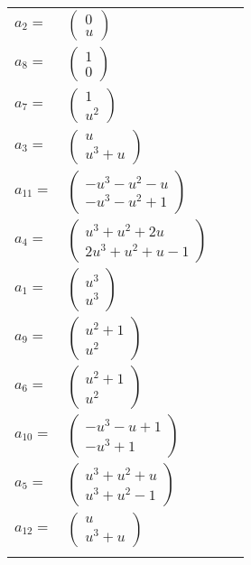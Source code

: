 \documentclass[1p]{elsarticle_modified}
\theoremstyle{definition}
\begin{document}
\begin{tabular}{m{7pt} m{180pt} m{7pt} m{180pt} }
\flushright $a_{2}=$&$\begin{pmatrix}0\\u\end{pmatrix}$ \\
\flushright $a_{8}=$&$\begin{pmatrix}1\\0\end{pmatrix}$ \\
\flushright $a_{7}=$&$\begin{pmatrix}1\\u^2\end{pmatrix}$ \\
\flushright $a_{3}=$&$\begin{pmatrix}u\\u^3+u\end{pmatrix}$ \\
\flushright $a_{11}=$&$\begin{pmatrix}- u^3- u^2- u\\- u^3- u^2+1\end{pmatrix}$ \\
\flushright $a_{4}=$&$\begin{pmatrix}u^3+u^2+2 u\\2 u^3+u^2+u-1\end{pmatrix}$ \\
\flushright $a_{1}=$&$\begin{pmatrix}u^3\\u^3\end{pmatrix}$ \\
\flushright $a_{9}=$&$\begin{pmatrix}u^2+1\\u^2\end{pmatrix}$ \\
\flushright $a_{6}=$&$\begin{pmatrix}u^2+1\\u^2\end{pmatrix}$ \\
\flushright $a_{10}=$&$\begin{pmatrix}- u^3- u+1\\- u^3+1\end{pmatrix}$ \\
\flushright $a_{5}=$&$\begin{pmatrix}u^3+u^2+u\\u^3+u^2-1\end{pmatrix}$ \\
\flushright $a_{12}=$&$\begin{pmatrix}u\\u^3+u\end{pmatrix}$\\&\end{tabular}
\end{document}
